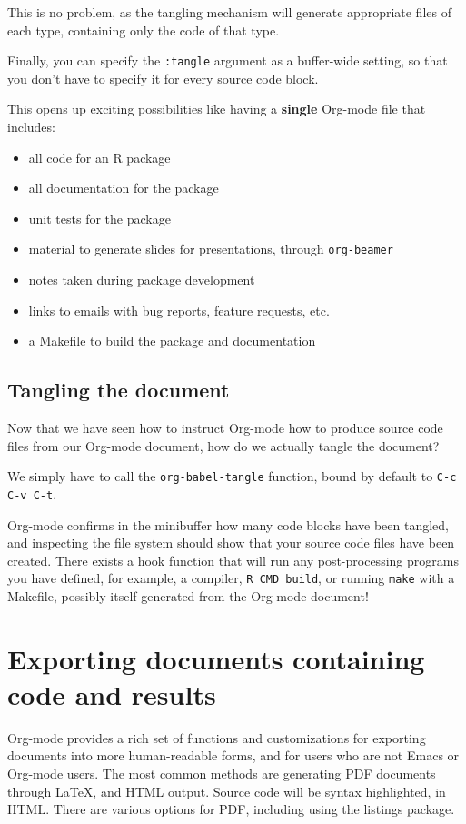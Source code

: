 \documentclass[11pt]{article}
\begin{document}
This is no problem, as the tangling mechanism will generate appropriate files of each type, containing only the code of that type.

Finally, you can specify the \texttt{:tangle} argument as a buffer-wide setting, so that you don't have to specify it for every source code block.

This opens up exciting possibilities like having a \textbf{single} Org-mode file that includes:
\begin{itemize}
\item all code for an R package
\item all documentation for the package
\item unit tests for the package
\item material to generate slides for presentations, through \texttt{org-beamer}
\item notes taken during package development
\item links to emails with bug reports, feature requests, etc.
\item a Makefile to build the package and documentation
\end{itemize}
\subsection*{Tangling the document}
\label{sec-8-2}

Now that we have seen how to instruct Org-mode how to produce source code files from our Org-mode document, how do we actually tangle the document?

We simply have to call the \texttt{org-babel-tangle} function, bound by default to \texttt{C-c C-v C-t}. 

Org-mode confirms in the minibuffer how many code blocks have been tangled, and inspecting the file system should show that your source code files have been created. There exists a hook function that will run any post-processing programs you have defined, for example, a compiler, \texttt{R CMD build}, or running \texttt{make} with a Makefile, possibly itself generated from the Org-mode document!
\section*{Exporting documents containing code and results}
\label{sec-9}

Org-mode provides a rich set of functions and customizations for exporting documents into more human-readable forms, and for users who are not Emacs or Org-mode users. The most common methods are generating PDF documents through \LaTeX{}, and HTML output. Source code will be syntax highlighted, in HTML.  There are various options for PDF, including using the listings package.
\end{document}
